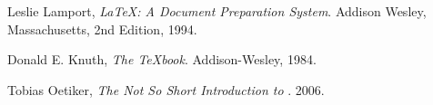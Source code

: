    Leslie Lamport,
    \emph{\LaTeX: A Document Preparation System}.
    Addison Wesley, Massachusetts,
    2nd Edition,
    1994.
  
    Donald E. Knuth,
    \emph{The \TeX book}.
    Addison-Wesley, 1984.
    
    Tobias Oetiker,
    \emph{The Not So Short Introduction to \LaTeXe}.
    2006.
